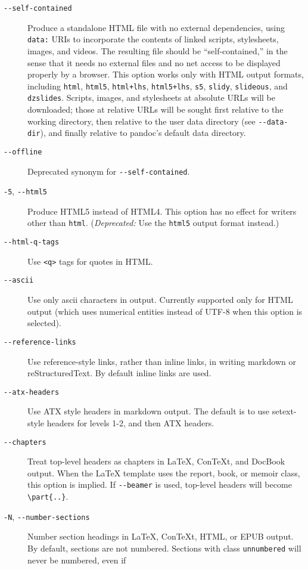 \documentclass[]{article}
\begin{document}
\begin{description}
\item[\texttt{-{}-self-contained}]
Produce a standalone HTML file with no external dependencies, using
\texttt{data:} URIs to incorporate the contents of linked scripts,
stylesheets, images, and videos. The resulting file should be
``self-contained,'' in the sense that it needs no external files and no
net access to be displayed properly by a browser. This option works only
with HTML output formats, including \texttt{html}, \texttt{html5},
\texttt{html+lhs}, \texttt{html5+lhs}, \texttt{s5}, \texttt{slidy},
\texttt{slideous}, and \texttt{dzslides}. Scripts, images, and
stylesheets at absolute URLs will be downloaded; those at relative URLs
will be sought first relative to the working directory, then relative to
the user data directory (see \texttt{-{}-data-dir}), and finally
relative to pandoc's default data directory.
\item[\texttt{-{}-offline}]
Deprecated synonym for \texttt{-{}-self-contained}.
\item[\texttt{-5}, \texttt{-{}-html5}]
Produce HTML5 instead of HTML4. This option has no effect for writers
other than \texttt{html}. (\emph{Deprecated:} Use the \texttt{html5}
output format instead.)
\item[\texttt{-{}-html-q-tags}]
Use \texttt{\textless{}q\textgreater{}} tags for quotes in HTML.
\item[\texttt{-{}-ascii}]
Use only ascii characters in output. Currently supported only for HTML
output (which uses numerical entities instead of UTF-8 when this option
is selected).
\item[\texttt{-{}-reference-links}]
Use reference-style links, rather than inline links, in writing markdown
or reStructuredText. By default inline links are used.
\item[\texttt{-{}-atx-headers}]
Use ATX style headers in markdown output. The default is to use
setext-style headers for levels 1-2, and then ATX headers.
\item[\texttt{-{}-chapters}]
Treat top-level headers as chapters in LaTeX, ConTeXt, and DocBook
output. When the LaTeX template uses the report, book, or memoir class,
this option is implied. If \texttt{-{}-beamer} is used, top-level
headers will become \texttt{\textbackslash{}part\{..\}}.
\item[\texttt{-N}, \texttt{-{}-number-sections}]
Number section headings in LaTeX, ConTeXt, HTML, or EPUB output. By
default, sections are not numbered. Sections with class
\texttt{unnumbered} will never be numbered, even if

\end{description}
\end{document}
